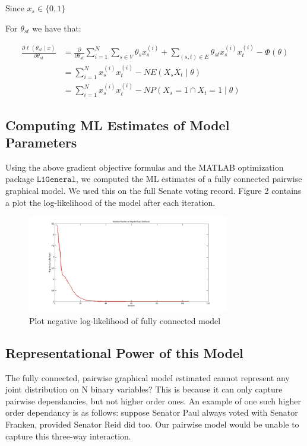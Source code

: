 \documentclass[]{article}
\begin{document}
Since \(x_s \in \{0,1\}\)

For \(\theta_{st}\) we have that:

\begin{align*}
\frac{\partial \ell(\theta_{st} \mid x)}{\partial \theta_{st}} &= \frac{\partial}{\partial \theta_{st}} \sum_{i=1}^N \sum_{s \in V}  \theta_{s}x_{s}^{(i)} + \sum_{(s,t) \in E} \theta_{st}x_{s}^{(i)}x_{t}^{(i)}-\Phi(\theta) \\
&=\sum_{i=1}^N x_{s}^{(i)}x_{t}^{(i)} - N E(X_s X_t \mid \theta) \\
&=\sum_{i=1}^N x_{s}^{(i)}x_{t}^{(i)} - N P(X_s = 1 \cap X_t = 1 \mid \theta)
\end{align*}

\subsection{Computing ML Estimates of Model
Parameters}\label{computing-ml-estimates-of-model-parameters}

Using the above gradient objective formulas and the MATLAB optimization
package \(\texttt{L1General}\), we computed the ML estimates of a fully
connected pairwise graphical model. We used this on the full Senate
voting record. Figure 2 contains a plot the log-likelihood of the model
after each iteration.

\begin{figure}
\begin{center}
\includegraphics[width=250pt]{fig2.jpg}
\caption{Plot negative log-likelihood of fully connected model}
\end{center}
\end{figure}

\subsection{Representational Power of this
Model}\label{representational-power-of-this-model}

The fully connected, pairwise graphical model estimated cannot represent
any joint distribution on N binary variables? This is because it can
only capture pairwise dependancies, but not higher order ones. An
example of one such higher order dependancy is as follows: suppose
Senator Paul always voted with Senator Franken, provided Senator Reid
did too. Our pairwise model would be unable to capture this three-way
interaction.
\end{document}
